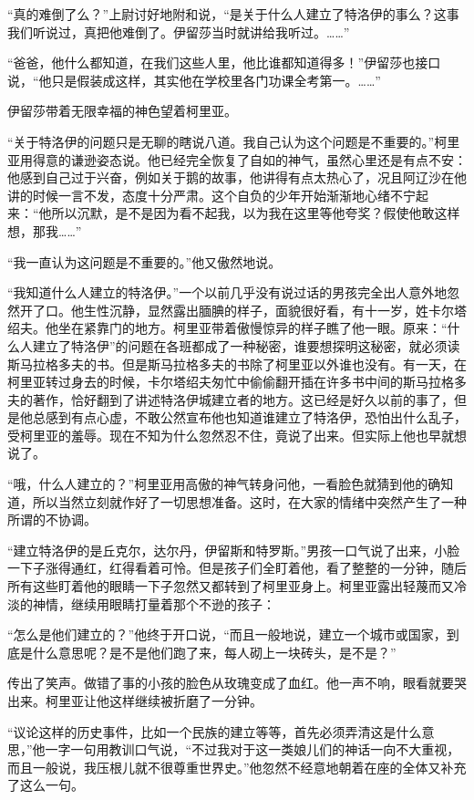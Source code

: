 \par “真的难倒了么？”上尉讨好地附和说，“是关于什么人建立了特洛伊的事么？这事我们听说过，真把他难倒了。伊留莎当时就讲给我听过。……”
\par “爸爸，他什么都知道，在我们这些人里，他比谁都知道得多！”伊留莎也接口说，“他只是假装成这样，其实他在学校里各门功课全考第一。……”
\par 伊留莎带着无限幸福的神色望着柯里亚。
\par “关于特洛伊的问题只是无聊的瞎说八道。我自己认为这个问题是不重要的。”柯里亚用得意的谦逊姿态说。他已经完全恢复了自如的神气，虽然心里还是有点不安：他感到自己过于兴奋，例如关于鹅的故事，他讲得有点太热心了，况且阿辽沙在他讲的时候一言不发，态度十分严肃。这个自负的少年开始渐渐地心绪不宁起来：“他所以沉默，是不是因为看不起我，以为我在这里等他夸奖？假使他敢这样想，那我……”
\par “我一直认为这问题是不重要的。”他又傲然地说。
\par “我知道什么人建立的特洛伊。”一个以前几乎没有说过话的男孩完全出人意外地忽然开了口。他生性沉静，显然露出腼腆的样子，面貌很好看，有十一岁，姓卡尔塔绍夫。他坐在紧靠门的地方。柯里亚带着傲慢惊异的样子瞧了他一眼。原来：“什么人建立了特洛伊”的问题在各班都成了一种秘密，谁要想探明这秘密，就必须读斯马拉格多夫的书。但是斯马拉格多夫的书除了柯里亚以外谁也没有。有一天，在柯里亚转过身去的时候，卡尔塔绍夫匆忙中偷偷翻开插在许多书中间的斯马拉格多夫的著作，恰好翻到了讲述特洛伊城建立者的地方。这已经是好久以前的事了，但是他总感到有点心虚，不敢公然宣布他也知道谁建立了特洛伊，恐怕出什么乱子，受柯里亚的羞辱。现在不知为什么忽然忍不住，竟说了出来。但实际上他也早就想说了。
\par “哦，什么人建立的？”柯里亚用高傲的神气转身问他，一看脸色就猜到他的确知道，所以当然立刻就作好了一切思想准备。这时，在大家的情绪中突然产生了一种所谓的不协调。
\par “建立特洛伊的是丘克尔，达尔丹，伊留斯和特罗斯。”男孩一口气说了出来，小脸一下子涨得通红，红得看着可怜。但是孩子们全盯着他，看了整整的一分钟，随后所有这些盯着他的眼睛一下子忽然又都转到了柯里亚身上。柯里亚露出轻蔑而又冷淡的神情，继续用眼睛打量着那个不逊的孩子：
\par “怎么是他们建立的？”他终于开口说，“而且一般地说，建立一个城市或国家，到底是什么意思呢？是不是他们跑了来，每人砌上一块砖头，是不是？”
\par 传出了笑声。做错了事的小孩的脸色从玫瑰变成了血红。他一声不响，眼看就要哭出来。柯里亚让他这样继续被折磨了一分钟。
\par “议论这样的历史事件，比如一个民族的建立等等，首先必须弄清这是什么意思，”他一字一句用教训口气说，“不过我对于这一类娘儿们的神话一向不大重视，而且一般说，我压根儿就不很尊重世界史。”他忽然不经意地朝着在座的全体又补充了这么一句。
